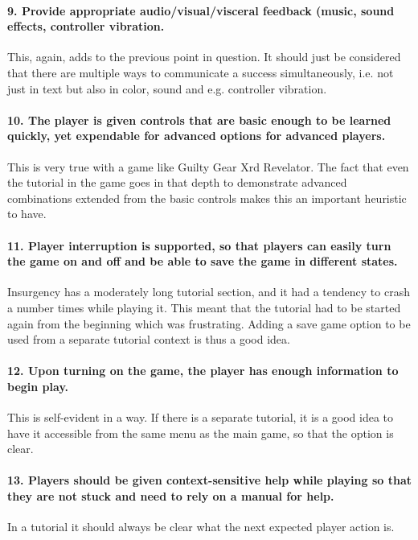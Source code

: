 \paragraph{9. Provide appropriate audio/visual/visceral feedback (music, sound effects, controller vibration.} This, again, adds to the previous point in question. It should just be considered that there are multiple ways to communicate a success simultaneously, i.e. not just in text but also in color, sound and e.g. controller vibration.

\paragraph{10. The player is given controls that are basic enough to be learned quickly, yet expendable for advanced options for advanced players.} This is very true with a game like Guilty Gear Xrd Revelator. The fact that even the tutorial in the game goes in that depth to demonstrate advanced combinations extended from the basic controls makes this an important heuristic to have.

\paragraph{11. Player interruption is supported, so that players can easily turn the game on and off and be able to save the game in different states.} Insurgency has a moderately long tutorial section, and it had a tendency to crash a number times while playing it. This meant that the tutorial had to be started again from the beginning which was frustrating. Adding a save game option to be used from a separate tutorial context is thus a good idea.

\paragraph{12. Upon turning on the game, the player has enough information to begin play.} This is self-evident in a way. If there is a separate tutorial, it is a good idea to have it accessible from the same menu as the main game, so that the option is clear.

\paragraph{13. Players should be given context-sensitive help while playing so that they are not stuck and need to rely on a manual for help.} 
In a tutorial it should always be clear what the next expected player action is.

